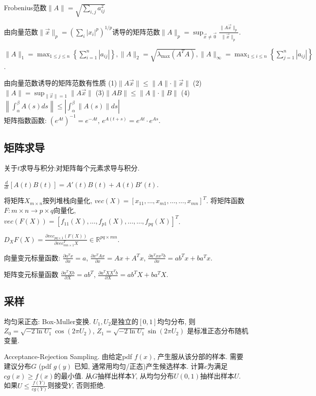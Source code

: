 \documentclass[UTF8]{ctexart}
\begin{document}
Frobenius范数$\| A\|=\sqrt{\sum_{i,j}a_{ij}^2}$

由向量范数$\| \vec{x}\| _p=(\sum _i |x_i|^p)^{1/p}$诱导的矩阵范数$\| A\|_p=\operatorname{sup}
	_{\vec{x}\neq \vec{0}} \frac{\| A\vec{x} \|_p}{\| \vec{x} \|_p}$.


$\|A\|_{1}=\max _{1 \leqslant j \leqslant n}\left\{\sum_{i=1}^{n}\left|a_{i j}\right|\right\},
	\|A\|_{2}=\sqrt{\lambda_{\max} \left(A^T A\right)},
	\|A\|_{\infty}=\max _{1 \leqslant i \leqslant n}\left\{\sum_{j=1}^{n}\left|a_{i j}\right|\right\}$. \par

由向量范数诱导的矩阵范数有性质
(1)$\|A \vec{x}\| \leqslant\|A\| \cdot\|\vec{x}\|$ \quad
(2)$\|A\|=\sup _{\|\vec{x}\|=1}\|A \vec{x}\|$ \quad
(3)$\|A B\| \leqslant\|A\| \cdot\|B\|$ \quad
(4)$\left\|\int_{\alpha}^{\beta} A(s) d s\right\| \leqslant\left|\int_{\alpha}^{\beta}\|A(s)\| d s\right|$
~\\

矩阵指数函数: $(e^{At})^{-1}=e^{-At}$, $e^{A(t+s)}=e^{At}\cdot e^{As}$.


\subsection{矩阵求导}
关于$t$求导与积分:对矩阵每个元素求导与积分.

$\frac{d}{dt}[A(t)B(t)]=A'(t)B(t)+A(t)B'(t)$.

将矩阵$X_{m\times n}$按列堆栈向量化, $vec(X)=[x_{11},\dots,x_{m1},\dots,\dots,x_{mn}]^T$.
将矩阵函数$F:m\times n\to p\times q$向量化, $vec(F(X))=[f_{11}(X),\dots,f_{p1}(X),\dots,\dots,f_{pq}(X)]^T$.

$D_X F(X)=\frac{\partial vec_{pq\times 1}(F(X))}{\partial vec_{mn\times 1}^T X} \in \mathbb{R}^{pq\times mn}$.


向量变元标量函数:
$\frac{\partial a^Tx}{\partial x}=a$,
$\frac{\partial x^TAx}{\partial x}=Ax+A^Tx$,
$\frac{\partial a^T xx^T b}{\partial x}=ab^Tx+ba^Tx$.

矩阵变元标量函数
$\frac{\partial a^T X b}{\partial X}=ab^T$,
$\frac{\partial a^T XX^T b}{\partial X}=ab^TX+ba^TX$.

\subsection{采样}

均匀采正态: Box-Muller变换. $U_1, U_2$是独立的$[0, 1]$均匀分布,
则$Z_0=\sqrt{-2\ln U_1}\cos(2\pi U_2)$, $Z_1=\sqrt{-2\ln U_1}\sin(2\pi U_2)$
是标准正态分布随机变量.

Acceptance-Rejection Sampling.
由给定pdf $f(x)$, 产生服从该分部的样本.
需要建议分布$G$ (pdf $g(y)$ 已知, 通常用均匀/正态)产生候选样本.
计算$c$为满足$cg(x)\geq f(x)$的最小值.
从$G$抽样出样本$Y$, 从均匀分布$U(0,1)$抽样出样本$U$.
如果$U\leq\frac{f(Y)}{cg(Y)}$则接受$Y$, 否则拒绝.
\end{document}
